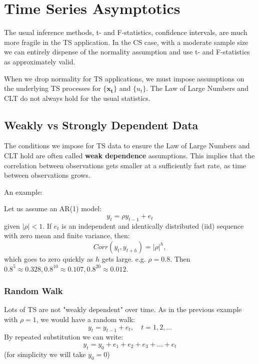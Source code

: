 \documentclass[11pt]{article}
\begin{document}
\section{Time Series Asymptotics}

The usual inference methods, t- and F-statistics, confidence intervals, are much more fragile in the TS application. In the CS case, with a moderate sample size we can entirely dispense of the normality assumption and use t- and F-statistics as approximately valid.

When we drop normality for TS applications, we must impose assumptions on the underlying TS processes for $\{\boldsymbol{x_t}\}$ and $\{u_t\}$. The Law of Large Numbers and CLT do not always hold for the usual statistics.

\subsection{Weakly vs Strongly Dependent Data}

The conditions we impose for TS data to ensure the Law of Large Numbers and CLT hold are often called \textbf{weak dependence} assumptions. This implies that the correlation between observations gets smaller at a sufficiently fast rate, as time between observations grows.

An example:
\begin{mdframed}
Let us assume an AR(1) model:
\[y_t = \rho y_{t-1} + e_t\]
given $|\rho|<1$. If $e_t$ is an independent and identically distributed (iid) sequence with zero mean and finite variance, then:
\[Corr(y_t, y_{t+h}) = |\rho|^h,\]
which goes to zero quickly as $h$ gets large. e.g. $\rho = 0.8$. Then $0.8^5 \approx 0.328, 0.8^{10} \approx 0.107, 0.8^{20} \approx 0.012$. 
\end{mdframed}

\subsubsection{Random Walk}

Lots of TS are not "weakly dependent" over time. As in the previous example with $\rho = 1$, we would have a random walk:
\[y_t = y_{t-1} + e_t, \quad t = 1,2,\ldots\]
By repeated substitution we can write:
\begin{equation}
    \label{random walk repeat sub}
    y_t = y_0 + e_1 + e_2 + e_3 + \ldots + e_t
\end{equation}
(for simplicity we will take $y_0 = 0$)
\end{document}

